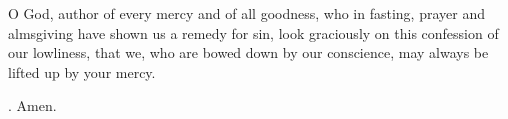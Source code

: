 \lettrine[lines=3]{O}{} God, author of every mercy and of all goodness, 
who in fasting, prayer and almsgiving
have shown us a remedy for sin,
look graciously on this confession of our lowliness,
that we, who are bowed down by our conscience,
may always be lifted up by your mercy.\par \Rbar. Amen.
